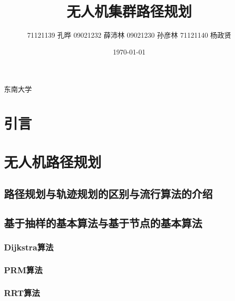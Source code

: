 \documentclass[conference]{IEEEtran}
\title{无人机集群路径规划}
\author{71121139 孔晔
    09021232 薛沛林
    09021230 孙彦林
    71121140 杨政贤}
\date{\today}
\begin{document}
\maketitle


\begin{abstract}


\end{abstract}



\begin{IEEEkeywords}

    东南大学


\end{IEEEkeywords}

\section{引言}



\section{无人机路径规划}


\subsection{路径规划与轨迹规划的区别与流行算法的介绍}


\subsection{基于抽样的基本算法与基于节点的基本算法}

\subsubsection{Dijkstra算法}

\subsubsection{PRM算法}

\subsubsection{RRT算法}
\end{document}
